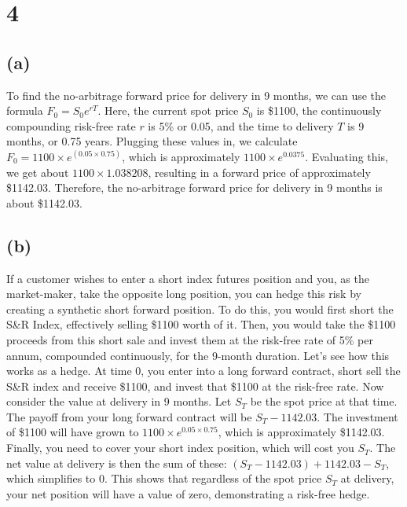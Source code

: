    \section{4}\label{section}

\subsection{(a)}\label{a}

To find the no-arbitrage forward price for delivery in 9 months, we can
use the formula \(F_0 = S_0 e^{rT}\). Here, the current spot price
\(S_0\) is \$1100, the continuously compounding risk-free rate \(r\) is
5\% or 0.05, and the time to delivery \(T\) is 9 months, or 0.75 years.
Plugging these values in, we calculate
\(F_0 = 1100 \times e^{(0.05 \times 0.75)}\), which is approximately
\(1100 \times e^{0.0375}\). Evaluating this, we get about
\(1100 \times 1.038208\), resulting in a forward price of approximately
\$1142.03. Therefore, the no-arbitrage forward price for delivery in 9
months is about \$1142.03.

\subsection{(b)}\label{b}

If a customer wishes to enter a short index futures position and you, as
the market-maker, take the opposite long position, you can hedge this
risk by creating a synthetic short forward position. To do this, you
would first short the S\&R Index, effectively selling \$1100 worth of
it. Then, you would take the \$1100 proceeds from this short sale and
invest them at the risk-free rate of 5\% per annum, compounded
continuously, for the 9-month duration. Let's see how this works as a
hedge. At time 0, you enter into a long forward contract, short sell the
S\&R index and receive \$1100, and invest that \$1100 at the risk-free
rate. Now consider the value at delivery in 9 months. Let \(S_T\) be the
spot price at that time. The payoff from your long forward contract will
be \(S_T - 1142.03\). The investment of \$1100 will have grown to
\(1100 \times e^{0.05 \times 0.75}\), which is approximately \$1142.03.
Finally, you need to cover your short index position, which will cost
you \(S_T\). The net value at delivery is then the sum of these:
\((S_T - 1142.03) + 1142.03 - S_T\), which simplifies to 0. This shows
that regardless of the spot price \(S_T\) at delivery, your net position
will have a value of zero, demonstrating a risk-free hedge.

